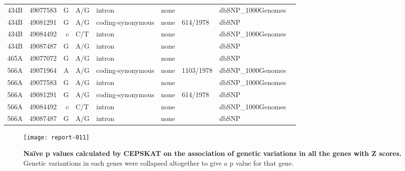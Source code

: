 \documentclass{article}
\begin{document}
\begin{table}[tbp]
{\begin{tabular}{rlrllllll}
434B & 49077583 & G & A/G & intron & none &  & dbSNP\_1000Genomes \\ 
434B & 49081291 & G & A/G & coding-synonymous & none & 614/1978 & dbSNP \\ 
434B & 49084492 & c & C/T & intron & none &  & dbSNP\_1000Genomes \\ 
434B & 49087487 & G & A/G & intron & none &  & dbSNP \\ 
465A & 49077072 & G & A/G & intron & none &  & dbSNP \\ 
566A & 49071964 & A & A/G & coding-synonymous & none & 1103/1978 & dbSNP\_1000Genomes \\ 
566A & 49077583 & G & A/G & intron & none &  & dbSNP\_1000Genomes \\ 
566A & 49081291 & G & A/G & coding-synonymous & none & 614/1978 & dbSNP \\ 
566A & 49084492 & c & C/T & intron & none &  & dbSNP\_1000Genomes \\ 
566A & 49087487 & G & A/G & intron & none &  & dbSNP \\ 
   \hline
\end{tabular}
}
\end{table}

\begin{figure}[htb]
\centering
\texttt{[image: report-011]}

\caption{{\bf {Na\"ive p values calculated by CEPSKAT on the association of genetic variations in all the genes with Z scores.}} Genetic variantions in each genes were collapsed altogether to give a p value for that gene. }
\label{fig:allGene}
\end{figure}
\end{document}
